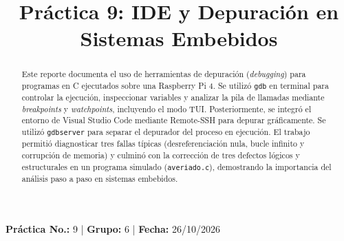 \documentclass[conference]{IEEEtran}
\begin{document}
\title{Práctica 9: IDE y Depuración en Sistemas Embebidos}

\author{
	\and
	\and
	\and
	\and
	\and
}

\maketitle

\begin{center}
	\vspace{-0.3cm}
	{\small
		\textbf{Práctica No.:} 9 \quad | \quad
		\textbf{Grupo:} 6 \quad | \quad
		\textbf{Fecha:} 26/10/2026
	}
	\vspace{0.2cm}
\end{center}

\begin{abstract}
	Este reporte documenta el uso de herramientas de depuración (\textit{debugging}) para programas en C ejecutados sobre una Raspberry Pi 4. Se utilizó \texttt{gdb} en terminal para controlar la ejecución, inspeccionar variables y analizar la pila de llamadas mediante \textit{breakpoints} y \textit{watchpoints}, incluyendo el modo TUI. Posteriormente, se integró el entorno de Visual Studio Code mediante Remote-SSH para depurar gráficamente. Se utilizó \texttt{gdbserver} para separar el depurador del proceso en ejecución. El trabajo permitió diagnosticar tres fallas típicas (desreferenciación nula, bucle infinito y corrupción de memoria) y culminó con la corrección de tres defectos lógicos y estructurales en un programa simulado (\texttt{averiado.c}), demostrando la importancia del análisis paso a paso en sistemas embebidos.
\end{abstract}
\end{document}
